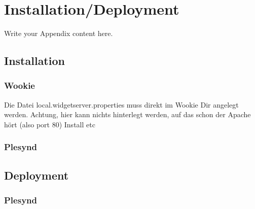 
\chapter{Installation/Deployment}
\label{AppendixA}

Write your Appendix content here.
\section{Installation}

\subsection{Wookie}
Die Datei local.widgetserver.properties muss direkt im Wookie Dir angelegt werden.
Achtung, hier kann nichts hinterlegt werden, auf das schon der Apache hört (also port 80)
Install etc

\subsection{Plesynd}


\section{Deployment}


\subsection{Plesynd}